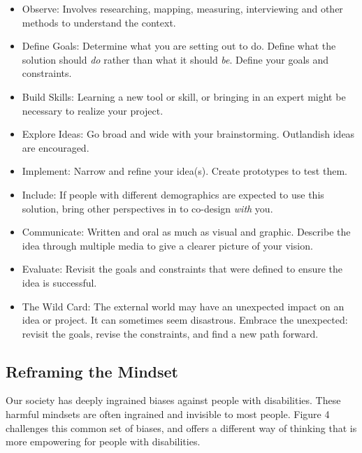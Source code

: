 \documentclass[11.5pt]{sig-alternate} %
\begin{document}
\begin{large}
\begin{itemize}
    \item 	Observe: Involves researching, mapping, measuring, interviewing and other methods to understand the context.
\item 	Define Goals: Determine what you are setting out to do. Define what the solution should \textit{do} rather than what it should \textit{be}. Define your goals and constraints.  
\item 	Build Skills: Learning a new tool or skill, or bringing in an expert might be necessary to realize your project. 
\item 	Explore Ideas: Go broad and wide with your brainstorming. Outlandish ideas are encouraged. 
\item 	Implement: Narrow and refine your idea(s). Create prototypes to test them. 
\item Include: If people with different demographics are expected to use this solution, bring other perspectives in to co-design \textit{with} you.
\item 	Communicate: Written and oral as much as visual and graphic. Describe the idea through multiple media to give a clearer picture of your vision. 
\item 	Evaluate: Revisit the goals and constraints that were defined to ensure the idea is successful. 
\item 	The Wild Card: The external world may have an unexpected impact on an idea or project. It can sometimes seem disastrous. Embrace the unexpected: revisit the goals, revise the constraints, and find a new path forward.        
\end{itemize}

\subsection*{Reframing the Mindset}

Our society has deeply ingrained biases against people with disabilities. These harmful mindsets are often ingrained and invisible to most people. Figure 4 challenges this common set of biases, and offers a different way of thinking that is more empowering for people with disabilities. 


\end{large}
\end{document}
